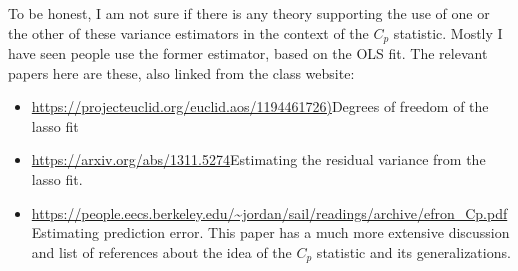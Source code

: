 \documentclass{article}
\begin{document}
\begin{enumerate}[(A)]
To be honest, I am not sure if there is any theory supporting the use of one or the other of these variance estimators in the context of the $C_p$ statistic.  Mostly I have seen people use the former estimator, based on the OLS fit.  The relevant papers here are these, also linked from the class website:
\begin{itemize}
\item \url{https://projecteuclid.org/euclid.aos/1194461726)}{Degrees of freedom of the lasso fit}
\item \url{https://arxiv.org/abs/1311.5274}{Estimating the residual variance from the lasso fit}.
\item \url{https://people.eecs.berkeley.edu/~jordan/sail/readings/archive/efron_Cp.pdf}{Estimating prediction error}.  This paper has a much more extensive discussion and list of references about the idea of the $C_p$ statistic and its generalizations.
\end{itemize}


\end{enumerate}
\end{document}
